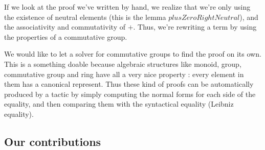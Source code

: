 If we look at the proof we've written by hand, we realize that we're only using the existence of neutral elements (this is the lemma $plusZeroRightNeutral$), and the associativity and commutativity of $+$. Thus, we're rewriting a term by using the properties of a commutative group.

We would like to let a solver for commutative groups to find the proof on its own.
This is a something doable because algebraic structures like monoid, group, commutative group and ring have all a very nice property : every element in them has a canonical represent. Thus these kind of proofs can be automatically produced by a tactic by simply computing the normal forms for each side of the equality, and then comparing them with the syntactical equality (Leibniz equality).

\subsection{Our contributions}

